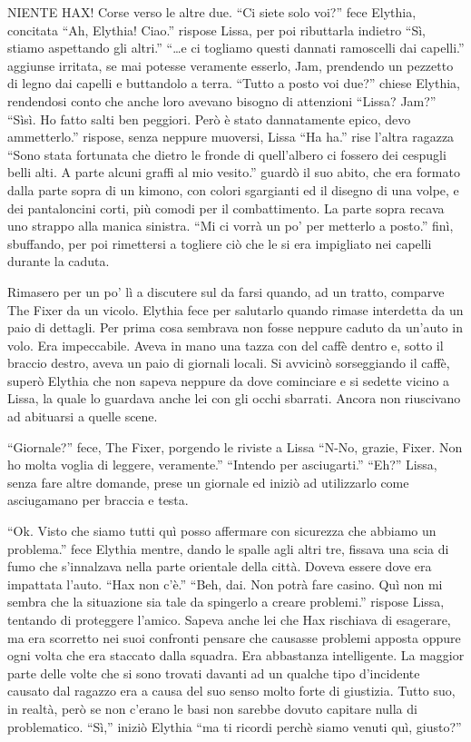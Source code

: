     NIENTE HAX! Corse verso le altre due. ``Ci siete solo voi?'' fece
    Elythia, concitata ``Ah, Elythia! Ciao.'' rispose Lissa,
    per poi ributtarla indietro ``Sì, stiamo aspettando gli altri.''
    ``\dots{}e ci togliamo questi dannati ramoscelli dai capelli.''
    aggiunse irritata, se mai potesse veramente esserlo, Jam, prendendo un
    pezzetto di legno dai capelli e buttandolo a terra. ``Tutto a posto voi
    due?'' chiese Elythia, rendendosi conto che anche loro avevano bisogno
    di attenzioni ``Lissa? Jam?'' ``Sìsì. Ho fatto salti ben peggiori. Però
    è stato dannatamente epico, devo ammetterlo.'' rispose, senza neppure
    muoversi, Lissa ``Ha ha.'' rise l'altra ragazza ``Sono stata fortunata
    che dietro le fronde di quell'albero ci fossero dei cespugli belli
    alti. A parte alcuni graffi al mio vesito.'' guardò il suo abito, che
    era formato dalla parte sopra di un kimono, con colori sgargianti ed il
    disegno di una volpe, e dei pantaloncini corti, più comodi per il
    combattimento. La parte sopra recava uno strappo alla manica sinistra.
    ``Mi ci vorrà un po' per metterlo a posto.'' finì, sbuffando, per poi
    rimettersi a togliere ciò che le si era impigliato nei capelli durante
    la caduta.

    Rimasero per un po' lì a discutere sul da farsi quando, ad un tratto,
    comparve The Fixer da un vicolo. Elythia fece per salutarlo quando
    rimase interdetta da un paio di dettagli. Per prima cosa sembrava non
    fosse neppure caduto da un'auto in volo. Era impeccabile. Aveva in mano
    una tazza con del caffè dentro e, sotto il braccio destro, aveva un
    paio di giornali locali. Si avvicinò sorseggiando il caffè, superò
    Elythia che non sapeva neppure da dove cominciare e si sedette vicino a
    Lissa, la quale lo guardava anche lei con gli occhi sbarrati. Ancora
    non riuscivano ad abituarsi a quelle scene.

    ``Giornale?'' fece, The Fixer, porgendo le riviste a Lissa ``N-No,
    grazie, Fixer. Non ho molta voglia di leggere, veramente.'' ``Intendo
    per asciugarti.'' ``Eh?'' Lissa, senza fare altre domande, prese un
    giornale ed iniziò ad utilizzarlo come asciugamano per braccia e testa.

    ``Ok. Visto che siamo tutti quì posso affermare con sicurezza che
    abbiamo un problema.'' fece Elythia mentre, dando le spalle agli altri
    tre, fissava una scia di fumo che s'innalzava nella parte orientale
    della città. Doveva essere dove era impattata l'auto. ``Hax non c'è.''
    ``Beh, dai. Non potrà fare casino. Quì non mi sembra che la situazione
    sia tale da spingerlo a creare problemi.'' rispose Lissa, tentando di
    proteggere l'amico. Sapeva anche lei che Hax rischiava di esagerare, ma
    era scorretto nei suoi confronti pensare che causasse problemi apposta
    oppure ogni volta che era staccato dalla squadra. Era abbastanza
    intelligente. La maggior parte delle volte che si sono trovati davanti
    ad un qualche tipo d'incidente causato dal ragazzo era a causa del suo
    senso molto forte di giustizia. Tutto suo, in realtà, però se non
    c'erano le basi non sarebbe dovuto capitare nulla di problematico.
    ``Sì,'' iniziò Elythia ``ma ti ricordi perchè siamo venuti quì,
    giusto?''


